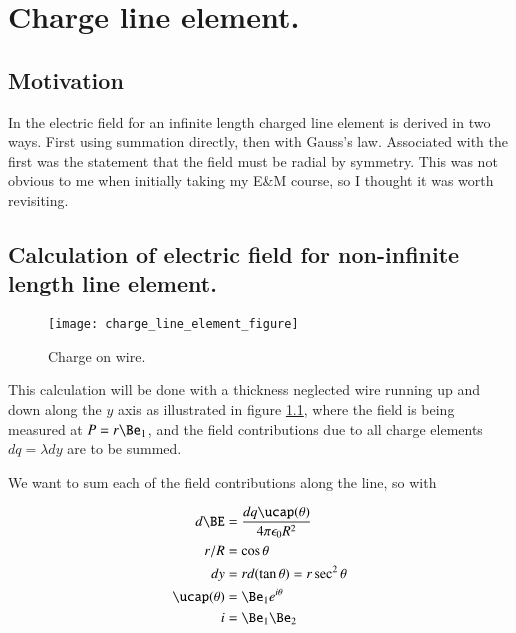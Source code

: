 \chapter{Charge line element.}
\label{chap:chargeLineElement}
\date{Nov 23, 2008.  chargeLineElement.tex}

\section{Motivation}

In \citep{purcell1963eam} the electric field for an infinite length charged line element is derived in two ways.  First using summation directly, then with Gauss's law.  Associated with the first was the statement that the field must be radial by symmetry.  This was not obvious to me when initially taking my E\&M course, so I thought it was worth revisiting.

\section{Calculation of electric field for non-infinite length line element. }

\begin{figure}[htp]
\centering
\texttt{[image: charge\_line\_element\_figure]}
\caption{Charge on wire.}\label{fig:chargeLineElement}
\end{figure}

This calculation will be done with a thickness neglected wire running up and down along the $y$ axis as illustrated 
in figure \ref{fig:chargeLineElement}, where the field is being measured at $P = r \Be_1$, and the field contributions
due to all charge elements $dq = \lambda dy$ are to be summed.

We want to sum each of the field contributions along the line, so with

\begin{align*}
d\BE &= \frac{dq \ucap(\theta)}{4 \pi \epsilon_0 R^2} \\
r/R &= \cos\theta \\
dy &= r d(\tan\theta) = r \sec^2 \theta \\
\ucap(\theta) &= \Be_1 e^{i \theta} \\
i &= \Be_1 \Be_2 
\end{align*}

%

